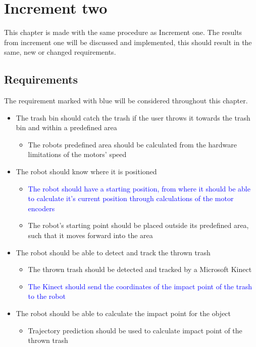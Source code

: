 \chapter{Increment two}
\label{chap:Increment two}
This chapter is made with the same procedure as Increment one. The results from increment one will be discussed and implemented, this should result in the same, new or changed requirements.  

\section{Requirements}
\label{sec:i2Requirements}
The requirement marked with blue will be considered throughout this chapter.

\begin{itemize}
	\item The trash bin should catch the trash if the user throws it towards the trash bin and within a predefined area
	\begin{itemize}
		\item {The robots predefined area should be calculated from the hardware limitations of the motors’ speed}
	\end{itemize}
	\item The robot should know where it is positioned
	\begin{itemize}
		\item \textcolor{blue}{The robot should have a starting position, from where it should be able to calculate it's current position through calculations of the motor encoders}
		\item {The robot's starting point should be placed outside its predefined area, such that it moves forward into the area}
	\end{itemize}
	\item The robot should be able to detect and track the thrown trash
	\begin{itemize}
		\item {The thrown trash should be detected and tracked by a Microsoft Kinect}
		\item \textcolor{blue}{The Kinect should send the coordinates of the impact point of the trash to the robot}
	\end{itemize}
	\item The robot should be able to calculate the impact point for the object
	\begin{itemize}
		\item {Trajectory prediction should be used to calculate impact point of the thrown trash}

\end{itemize}
\end{itemize}
